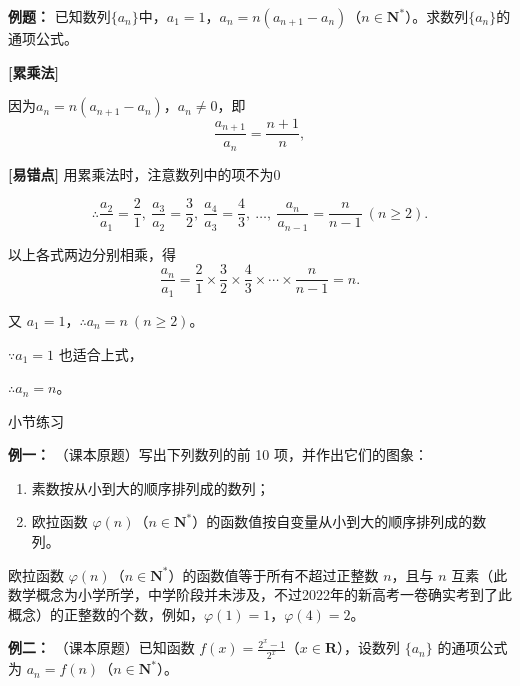 \documentclass{article}
\begin{document}
\vspace{2\baselineskip}

\noindent\textbf{例题： } 已知数列$\{a_n\}$中，$a_1 = 1$，$a_n = n(a_{n+1} - a_n)$（$n \in \mathbf{N}^*$）。求数列$\{a_n\}$的通项公式。

\bigskip

\noindent\textbf{[累乘法]}

因为$ a_n = n(a_{n+1} - a_n)$，$a_n \neq 0$，即
\[
\frac{a_{n+1}}{a_n} = \frac{n+1}{n},
\]

\begin{tcolorbox}[colback=blue!10,colframe=blue!70!black,title=]
\textbf{[易错点]} 用累乘法时，注意数列中的项不为0
\end{tcolorbox}

\[
\therefore \frac{a_2}{a_1} = \frac{2}{1},\ \frac{a_3}{a_2} = \frac{3}{2},\ \frac{a_4}{a_3} = \frac{4}{3},\ \dots,\ \frac{a_n}{a_{n-1}} = \frac{n}{n-1}\ (n \ge 2).
\]

以上各式两边分别相乘，得
\[
\frac{a_n}{a_1} = \frac{2}{1} \times \frac{3}{2} \times \frac{4}{3} \times \cdots \times \frac{n}{n-1} = n.
\]

又 $a_1 = 1$，$\therefore a_n = n\ (n \ge 2)$。

$\because a_1 = 1$ 也适合上式，

$\therefore a_n = n$。

\newpage

\begin{center}
    小节练习
\end{center}

\noindent\textbf{例一：} （课本原题）写出下列数列的前 10 项，并作出它们的图象：
\begin{enumerate}
    \item 素数按从小到大的顺序排列成的数列；
    \item 欧拉函数 $\varphi(n)$（$n\in \mathbf{N}^*$）的函数值按自变量从小到大的顺序排列成的数列。
\end{enumerate}

\begin{tcolorbox}[colback=blue!10,colframe=blue!70!black,title=]
欧拉函数 $\varphi(n)$（$n\in \mathbf{N}^*$）的函数值等于所有不超过正整数 $n$，且与 $n$ 互素（此数学概念为小学所学，中学阶段并未涉及，不过2022年的新高考一卷确实考到了此概念）的正整数的个数，例如，$\varphi(1)=1$，$\varphi(4)=2$。
\end{tcolorbox}
\vspace{10\baselineskip}

\noindent\textbf{例二：} （课本原题）已知函数 \(f(x) = \frac{2^x - 1}{2^x}\)（\(x \in \mathbf{R}\)），设数列 \(\{a_n\}\) 的通项公式为 \(a_n = f(n)\)（\(n \in \mathbf{N}^*\)）。
\end{document}
